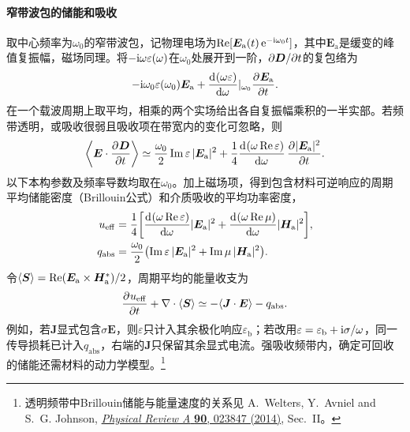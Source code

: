 \paragraph{窄带波包的储能和吸收}
取中心频率为$\omega_0$的窄带波包，记物理电场为$\operatorname{Re}[\bm E_{\mathrm{a}}(t)\mathop{}\!\mathrm{e}^{-\mathrm{i}\omega_0t}]$，其中$\bm E_{\mathrm{a}}$是缓变的峰值复振幅，磁场同理。将$-\mathrm{i}\omega\varepsilon(\omega)$在$\omega_0$处展开到一阶，$\partial\bm D/\partial t$的复包络为
\[
    -\mathrm{i}\omega_0\varepsilon(\omega_0)\bm E_{\mathrm{a}}
        + {\frac{\mathop{}\!\mathrm{d}^{}(\omega\varepsilon)}{\mathrm{d}{\omega}^{}}}\rvert_{\omega_0}\frac{\partial^{}\bm E_{\mathrm{a}}}{\partial{t}^{}} .
\]
在一个载波周期上取平均，相乘的两个实场给出各自复振幅乘积的一半实部。若频带透明，或吸收很弱且吸收项在带宽内的变化可忽略，则
\[
    \biggl\langle\bm E \cdot \frac{\partial^{}\bm D}{\partial{t}^{}}\biggr\rangle \simeq
      \frac{\omega_0}{2}\operatorname{Im}\varepsilon\,\lvert\bm E_{\mathrm{a}}\rvert^2 +
      \frac14\frac{\mathop{}\!\mathrm{d}^{}(\omega\operatorname{Re}\varepsilon)}{\mathrm{d}{\omega}^{}}\,\frac{\partial^{}\lvert\bm E_{\mathrm{a}}\rvert^2}{\partial{t}^{}} .
\]
以下本构参数及频率导数均取在$\omega_0$。加上磁场项，得到包含材料可逆响应的周期平均储能密度（Brillouin公式）和介质吸收的平均功率密度，
\begin{align}
    \label{eqn:Brillouin energy}
    u_{\mathrm{eff}} &= \frac14\biggl[\frac{\mathop{}\!\mathrm{d}^{}(\omega\operatorname{Re}\varepsilon)}{\mathrm{d}{\omega}^{}}\lvert\bm E_{\mathrm{a}}\rvert^2 +
                              \frac{\mathop{}\!\mathrm{d}^{}(\omega\operatorname{Re}\mu)}{\mathrm{d}{\omega}^{}}\lvert\bm H_{\mathrm{a}}\rvert^2\biggr],\\
    q_{\mathrm{abs}} &= \frac{\omega_0}{2}
        \bigl(\operatorname{Im}\varepsilon\,\lvert\bm E_{\mathrm{a}}\rvert^2 + \operatorname{Im}\mu\,\lvert\bm H_{\mathrm{a}}\rvert^2\bigr).
\end{align}
令$\langle\bm S\rangle = \operatorname{Re}(\bm E_{\mathrm{a}} \times \bm H_{\mathrm{a}}^\ast)/2$，周期平均的能量收支为
\begin{equation}
    \label{eqn:Poynting with loss}
    \frac{\partial^{}u_{\mathrm{eff}}}{\partial{t}^{}} + \nabla\cdot\langle\bm S\rangle \simeq -\langle\bm J \cdot \bm E\rangle - q_{\mathrm{abs}} .
\end{equation}
例如，若$\bm J$显式包含$\sigma\bm E$，则$\varepsilon$只计入其余极化响应$\varepsilon_{\mathrm b}$；若改用$\varepsilon = \varepsilon_{\mathrm b} + \mathrm{i}\sigma/\omega$，同一传导损耗已计入$q_{\mathrm{abs}}$，右端的$\bm J$只保留其余显式电流。强吸收频带内，确定可回收的储能还需材料的动力学模型。\footnote{透明频带中Brillouin储能与能量速度的关系见 A.~Welters, Y.~Avniel and S.~G. Johnson, \href{https://doi.org/10.1103/PhysRevA.90.023847}{\textit{Physical Review A} \textbf{90}, 023847 (2014)}, Sec.~II。}

